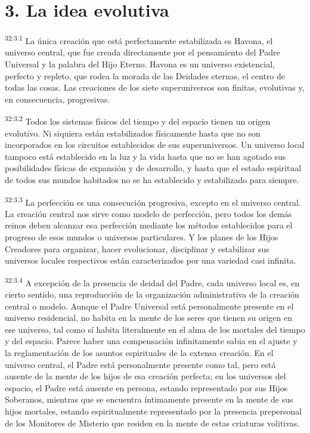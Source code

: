\section*{3. La idea evolutiva}
\par
\textsuperscript{32:3.1} La única creación que está perfectamente estabilizada es Havona, el universo central, que fue creada directamente por el pensamiento del Padre Universal y la palabra del Hijo Eterno. Havona es un universo existencial, perfecto y repleto, que rodea la morada de las Deidades eternas, el centro de todas las cosas. Las creaciones de los siete superuniversos son finitas, evolutivas y, en consecuencia, progresivas.

\par
\textsuperscript{32:3.2} Todos los sistemas físicos del tiempo y del espacio tienen un origen evolutivo. Ni siquiera están estabilizados físicamente hasta que no son incorporados en los circuitos establecidos de sus superuniversos. Un universo local tampoco está establecido en la luz y la vida hasta que no se han agotado sus posibilidades físicas de expansión y de desarrollo, y hasta que el estado espiritual de todos sus mundos habitados no se ha establecido y estabilizado para siempre.

\par
\textsuperscript{32:3.3} La perfección es una consecución progresiva, excepto en el universo central. La creación central nos sirve como modelo de perfección, pero todos los demás reinos deben alcanzar esa perfección mediante los métodos establecidos para el progreso de esos mundos o universos particulares. Y los planes de los Hijos Creadores para organizar, hacer evolucionar, disciplinar y estabilizar sus universos locales respectivos están caracterizados por una variedad casi infinita.

\par
\textsuperscript{32:3.4} A excepción de la presencia de deidad del Padre, cada universo local es, en cierto sentido, una reproducción de la organización administrativa de la creación central o modelo. Aunque el Padre Universal está personalmente presente en el universo residencial, no habita en la mente de los seres que tienen su origen en ese universo, tal como sí habita literalmente en el alma de los mortales del tiempo y del espacio. Parece haber una compensación infinitamente sabia en el ajuste y la reglamentación de los asuntos espirituales de la extensa creación. En el universo central, el Padre está personalmente presente como tal, pero está ausente de la mente de los hijos de esa creación perfecta; en los universos del espacio, el Padre está ausente en persona, estando representado por sus Hijos Soberanos, mientras que se encuentra íntimamente presente en la mente de sus hijos mortales, estando espiritualmente representado por la presencia prepersonal de los Monitores de Misterio que residen en la mente de estas criaturas volitivas.


